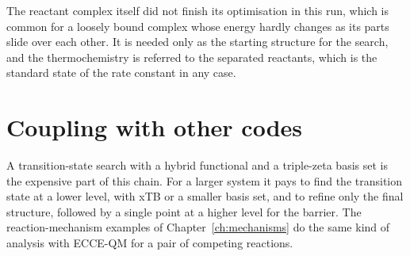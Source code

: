 The reactant complex itself did not finish its optimisation in this run, which is common for a loosely bound complex whose energy hardly changes as its parts slide over each other. It is needed only as the starting structure for the search, and the thermochemistry is referred to the separated reactants, which is the standard state of the rate constant in any case.

\section{Coupling with other codes}
A transition-state search with a hybrid functional and a triple-zeta basis set is the expensive part of this chain. For a larger system it pays to find the transition state at a lower level, with xTB or a smaller basis set, and to refine only the final structure, followed by a single point at a higher level for the barrier. The reaction-mechanism examples of Chapter~\ref{ch:mechanisms} do the same kind of analysis with ECCE-QM for a pair of competing reactions.
